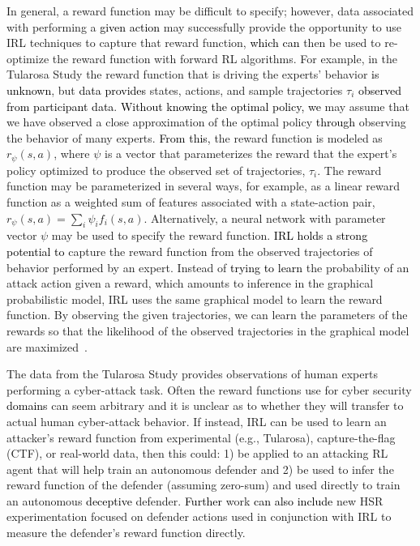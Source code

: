 \documentclass{article}
\newcommand\kjf[1]{\textcolor{black}{#1}}
\newcommand\nnn[1]{\textcolor{black}{#1}}
\begin{document}
In general, a reward function may be difficult to specify; however, data associated with performing a \nnn{given action} may successfully provide the opportunity to use IRL techniques to capture that reward function, \nnn{which can} then be used to re-optimize the reward function with forward RL algorithms. For example, in the Tularosa Study the reward function that is driving the experts' behavior \nnn{is unknown}, but \nnn{data provides} states, actions, and sample trajectories $\tau_i$ \nnn{observed from participant data}. \nnn{Without knowing the optimal policy, we} may assume that we have observed a close approximation of the optimal policy \nnn{through} observing the behavior of many experts.
\nnn{From this,} the reward function is modeled as $r_\psi(s,a)$, where $\psi$ is a vector that parameterizes the reward that the expert's policy optimized to produce the observed set of trajectories, ${\tau_i}$. The reward function may be parameterized in several ways, for example, as a linear reward function as a weighted sum of features associated with a state-action pair, 
$r_\psi(s,a)=\sum_i\psi_if_i(s,a)$. Alternatively, a neural network with parameter vector $\psi$ may be used to specify the reward function. \nnn{IRL holds a strong potential to} capture the reward function from the observed trajectories of behavior performed by an expert. Instead of \nnn{trying to learn} the probability of an attack action given a reward, which amounts to inference in the graphical probabilistic model, IRL uses the same graphical model to learn the reward function. By observing the given trajectories, we can learn the parameters of the rewards so that the likelihood of the observed trajectories in the graphical model are maximized~\cite{levine2018}. 

The data from the Tularosa Study provides observations of human experts performing a cyber-attack task. Often the reward functions use for cyber security \kjf{domains} can seem arbitrary and it is unclear as to whether they will transfer to actual human cyber-attack behavior. If instead, IRL can be used to learn an attacker's reward function from experimental (e.g., Tularosa), capture-the-flag (CTF), or real-world data, then this could: 1) be applied to an attacking RL agent that will help train an autonomous defender and 2) be used to infer the reward function of the defender (assuming zero-sum) and used directly to train an autonomous \nnn{deceptive} defender.  \nnn{Further} work \nnn{can also include} new HSR experimentation focused on defender actions used in conjunction with IRL to measure the defender's reward function directly. 
\end{document}
